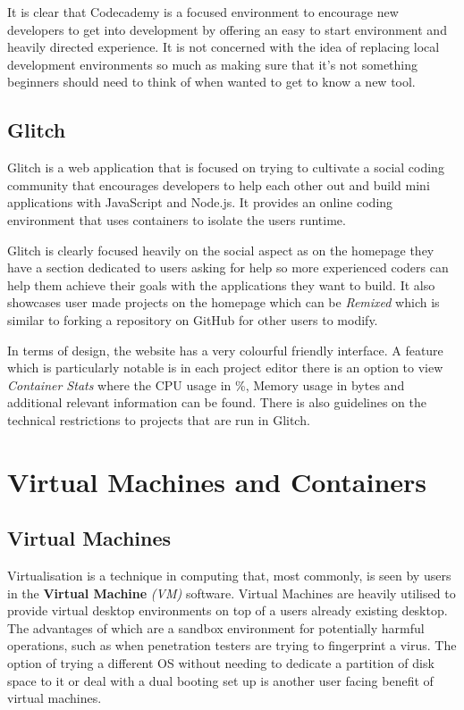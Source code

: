 It is clear that Codecademy is a focused environment to encourage new developers to get into development by offering an easy to start environment and heavily directed experience. It is not concerned with the idea of replacing local development environments so much as making sure that it's not something beginners should need to think of when wanted to get to know a new tool.

\subsection{Glitch}
Glitch is a web application that is focused on trying to cultivate a social coding community that encourages developers to help each other out and build mini applications with JavaScript and Node.js. It provides an online coding environment that uses containers to isolate the users runtime.

Glitch is clearly focused heavily on the social aspect as on the homepage they have a section dedicated to users asking for help so more experienced coders can help them achieve their goals with the applications they want to build. It also showcases user made projects on the homepage which can be \textit{Remixed} which is similar to forking a repository on GitHub for other users to modify.

In terms of design, the website has a very colourful friendly interface. A feature which is particularly notable is in each project editor there is an option to view \textit{Container Stats} where the CPU usage in \%, Memory usage in bytes and additional relevant information can be found. There is also guidelines on the technical restrictions to projects that are run in Glitch. 


\section{Virtual Machines and Containers} \label{lit-containers}

\subsection{Virtual Machines}

Virtualisation is a technique in computing that, most commonly, is seen by users in the \textbf{Virtual Machine} \textit{(VM)} software. Virtual Machines are heavily utilised to provide virtual desktop environments on top of a users already existing desktop. The advantages of which are a sandbox environment for potentially harmful operations, such as when penetration testers are trying to fingerprint a virus. The option of trying a different OS without needing to dedicate a partition of disk space to it or deal with a dual booting set up is another user facing benefit of virtual machines.

